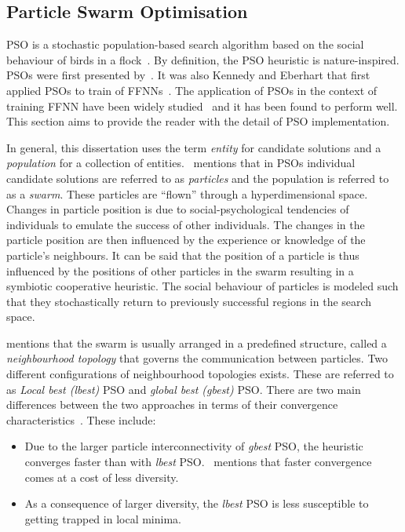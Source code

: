 \subsection{Particle Swarm Optimisation}
\label{sec:heuristics:mh:pso}

\Ac{PSO} is a stochastic population-based search algorithm based on the social behaviour of birds in a flock~\cite{ref:kennedy:1995}. By definition, the \acs{PSO} heuristic is nature-inspired.  \Acp{PSO} were first presented  by~\citeauthor{ref:kennedy:1995}\cite{ref:kennedy:1995}. It was also Kennedy and Eberhart that first applied \acp{PSO} to train of \acp{FFNN}~\cite{ref:eberhart:1995}\cite{ref:kennedy:1997}. The application of \acp{PSO} in the context of training \ac{FFNN} have been widely studied~\cite{ref:rakitianskaia:2012}\cite{ref:vanwyk:2014} and it has been found to perform well. This section aims to provide the reader with the detail of \ac{PSO} implementation.

In general, this dissertation uses the term \textit{entity} for candidate solutions and a \textit{population} for a collection of entities.~\citeauthor{ref:engelbrecht:2007}\cite{ref:engelbrecht:2007} mentions that in \acp{PSO} individual candidate solutions are referred to as \textit{particles} and the population is referred to as a \textit{swarm}. These particles are ``flown'' through a hyperdimensional space. Changes in particle position is due to social-psychological tendencies of individuals to emulate the success of other individuals. The changes in the particle position are then influenced by the experience or knowledge of the particle's neighbours. It can be said that the position of a particle is thus influenced by the positions of other particles in the swarm resulting in a symbiotic cooperative heuristic. The social behaviour of particles is modeled such that they stochastically return to previously successful regions in the search space.

\citeauthor{ref:vanwyk:2014}\cite{ref:vanwyk:2014} mentions that the swarm is usually arranged in a predefined structure, called a \textit{neighbourhood topology} that governs the communication between particles. Two different configurations of neighbourhood topologies exists. These are referred to as \textit{Local best (lbest)} \ac{PSO} and \textit{global best (gbest)} \ac{PSO}. There are two main differences between the two approaches in terms of their convergence characteristics~\cite{ref:eberhart:1996}. These include:

\begin{itemize}
      \item Due to the larger particle interconnectivity of \textit{gbest} \ac{PSO}, the heuristic converges faster than with \textit{lbest} \ac{PSO}.~\cite{ref:engelbrecht:2007} mentions that faster convergence comes at a cost of less diversity.
      \item As a consequence of larger diversity, the \textit{lbest} \ac{PSO} is less susceptible to getting trapped in local minima.
\end{itemize}


